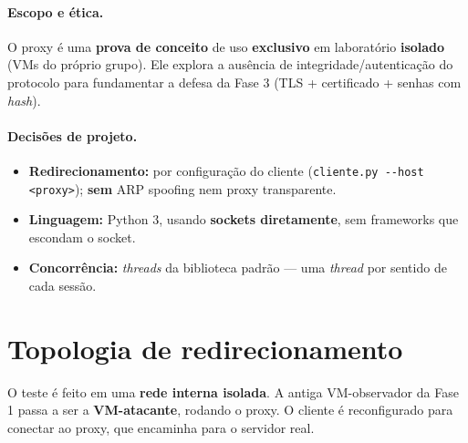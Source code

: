 \documentclass[11pt,a4paper]{article}
\begin{document}
\paragraph{Escopo e ética.} O proxy é uma \textbf{prova de conceito} de uso
\textbf{exclusivo} em laboratório \textbf{isolado} (VMs do próprio grupo). Ele
explora a ausência de integridade/autenticação do protocolo para fundamentar a
defesa da Fase 3 (TLS + certificado + senhas com \textit{hash}).

\paragraph{Decisões de projeto.}
\begin{itemize}[nosep]
  \item \textbf{Redirecionamento:} por configuração do cliente
        (\texttt{cliente.py -{}-host <proxy>}); \textbf{sem} ARP spoofing nem
        proxy transparente.
  \item \textbf{Linguagem:} Python 3, usando \textbf{sockets diretamente}, sem
        frameworks que escondam o socket.
  \item \textbf{Concorrência:} \textit{threads} da biblioteca padrão — uma
        \textit{thread} por sentido de cada sessão.
\end{itemize}

\section{Topologia de redirecionamento}

O teste é feito em uma \textbf{rede interna isolada}. A antiga VM-observador da
Fase 1 passa a ser a \textbf{VM-atacante}, rodando o proxy. O cliente é
reconfigurado para conectar ao proxy, que encaminha para o servidor real.
\end{document}
